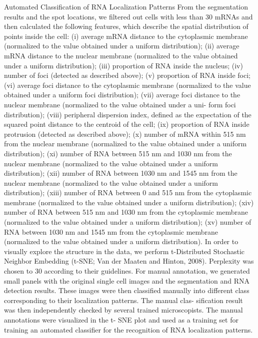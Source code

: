 Automated Classification of RNA Localization Patterns
From the segmentation results and the spot locations, we filtered out cells with less than 30 mRNAs and then calculated the following features, which describe the spatial distribution of points inside the cell: (i) average mRNA distance to the cytoplasmic membrane (normalized to the value obtained under a uniform distribution); (ii) average mRNA distance to the nuclear membrane (normalized to the value obtained under a uniform distribution); (iii) proportion of RNA inside the nucleus; (iv) number of foci (detected as described above); (v) proportion of RNA inside foci; (vi) average foci distance to the cytoplasmic membrane (normalized to the value obtained under a uniform foci distribution); (vii) average foci distance to the nuclear membrane (normalized to the value obtained under a uni- form foci distribution); (viii) peripheral dispersion index, defined as the expectation of the squared point distance to the centroid of the cell; (ix) proportion of RNA inside protrusion (detected as described above); (x) number of mRNA within 515 nm from the nuclear membrane (normalized to the value obtained under a uniform distribution); (xi) number of RNA between 515 nm and 1030 nm from the nuclear membrane (normalized to the value obtained under a uniform distribution); (xii) number of RNA between 1030 nm and 1545 nm from the nuclear membrane (normalized to the value obtained under a uniform distribution); (xiii) number of RNA between 0 and 515 nm from the cytoplasmic membrane (normalized to the value obtained under a uniform distribution); (xiv)
number of RNA between 515 nm and 1030 nm from the cytoplasmic membrane (normalized to the value obtained under a uniform distribution); (xv) number of RNA between 1030 nm and 1545 nm from the cytoplasmic membrane (normalized to the value obtained under a uniform distribution).
In order to visually explore the structure in the data, we perform t-Distributed Stochastic Neighbor Embedding (t-SNE; Van der Maaten and Hinton, 2008). Perplexity was chosen to 30 according to their guidelines.
For manual annotation, we generated small panels with the original single cell images and the segmentation and RNA detection results. These images were then classified manually into different class corresponding to their localization patterns. The manual clas- sification result was then independently checked by several trained microscopists. The manual annotations were visualized in the t- SNE plot and used as a training set for training an automated classifier for the recognition of RNA localization patterns.
